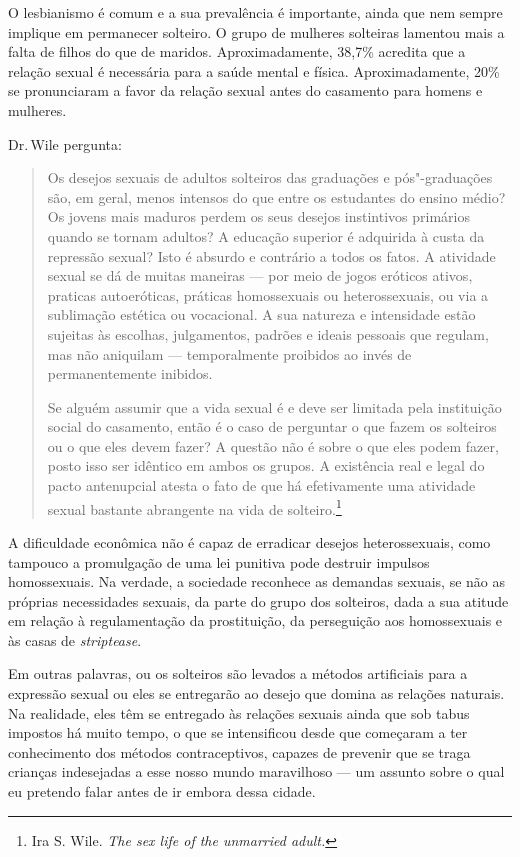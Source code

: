 O lesbianismo é comum e a sua prevalência é importante, ainda que nem
sempre implique em permanecer solteiro. O grupo de mulheres solteiras
lamentou mais a falta de filhos do que de maridos. Aproximadamente,
38,7\% acredita que a relação sexual é necessária para a saúde mental e
física. Aproximadamente, 20\% se pronunciaram a favor da relação sexual
antes do casamento para homens e mulheres.

Dr.\,Wile pergunta:

\begin{quote}
Os desejos sexuais de adultos solteiros das graduações e
pós"-graduações são, em
geral, menos intensos do que entre os estudantes do ensino médio? Os
jovens mais maduros perdem os seus desejos instintivos primários
quando se tornam adultos? A educação superior é adquirida à custa da
repressão sexual? Isto é absurdo e contrário a todos os fatos. A
atividade sexual se dá de muitas maneiras --- por meio de jogos eróticos
ativos, praticas autoeróticas, práticas homossexuais ou heterossexuais,
ou via a sublimação estética ou vocacional. A sua natureza e intensidade
estão sujeitas às escolhas, julgamentos, padrões e ideais pessoais que
regulam, mas não aniquilam --- temporalmente proibidos ao invés de
permanentemente inibidos.

Se alguém assumir que a vida sexual é e deve ser limitada pela
instituição social do casamento, então é o caso de perguntar o que fazem
os solteiros ou o que eles devem fazer? A questão não é sobre o que eles
podem fazer, posto isso ser idêntico em ambos os grupos. A existência
real e legal do pacto antenupcial atesta o fato de que há efetivamente
uma atividade sexual bastante abrangente na vida de
solteiro.\footnote{Ira S. Wile. \emph{The sex life of the unmarried
  adult.}}
\end{quote}


A dificuldade econômica não é capaz de erradicar desejos heterossexuais,
como tampouco a promulgação de uma lei punitiva pode destruir impulsos
homossexuais. Na verdade, a sociedade reconhece as demandas sexuais, se
não as próprias necessidades sexuais, da parte do grupo dos solteiros,
dada a sua atitude em relação à regulamentação da prostituição, da
perseguição aos homossexuais e às casas de \emph{striptease}.

Em outras palavras, ou os solteiros são levados a métodos artificiais
para a expressão sexual ou eles se entregarão ao desejo que domina as
relações naturais. Na realidade, eles têm se entregado às relações
sexuais ainda que sob tabus impostos há muito tempo, o que se intensificou desde que começaram a ter conhecimento dos
métodos contraceptivos, capazes de prevenir que se traga crianças
indesejadas a esse nosso mundo maravilhoso --- um assunto sobre o qual eu
pretendo falar antes de ir embora dessa cidade.

